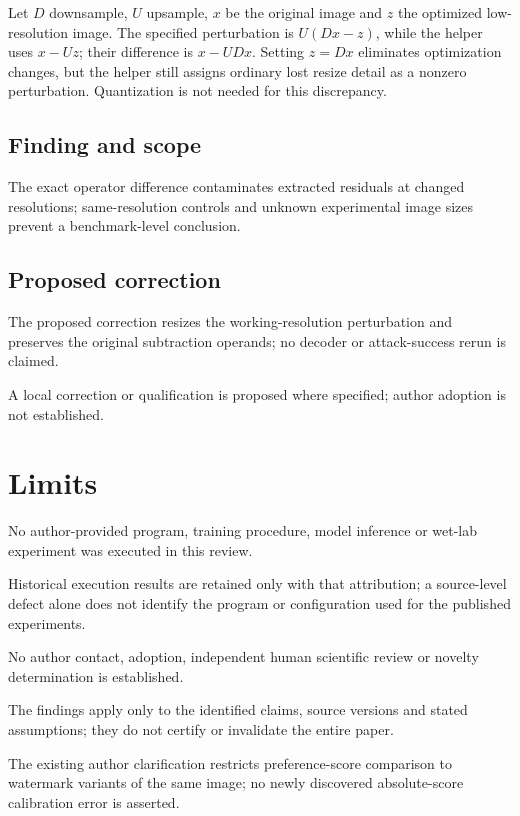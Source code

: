\documentclass[11pt]{article}
\begin{document}
Let \(D\) downsample, \(U\) upsample, \(x\) be the original image and \(z\) the optimized low-resolution image. The specified perturbation is \(U(Dx-z)\), while the helper uses \(x-Uz\); their difference is \(x-UDx\). Setting \(z=Dx\) eliminates optimization changes, but the helper still assigns ordinary lost resize detail as a nonzero perturbation. Quantization is not needed for this discrepancy.

\subsection*{Finding and scope}

The exact operator difference contaminates extracted residuals at changed resolutions; same-resolution controls and unknown experimental image sizes prevent a benchmark-level conclusion.

\subsection*{Proposed correction}

The proposed correction resizes the working-resolution perturbation and preserves the original subtraction operands; no decoder or attack-success rerun is claimed.

A local correction or qualification is proposed where specified; author adoption is not established.

\section*{Limits}

No author-provided program, training procedure, model inference or wet-lab experiment was executed in this review.\par

Historical execution results are retained only with that attribution; a source-level defect alone does not identify the program or configuration used for the published experiments.\par

No author contact, adoption, independent human scientific review or novelty determination is established.\par

The findings apply only to the identified claims, source versions and stated assumptions; they do not certify or invalidate the entire paper.\par

The existing author clarification restricts preference-score comparison to watermark variants of the same image; no newly discovered absolute-score calibration error is asserted.\par
\end{document}
